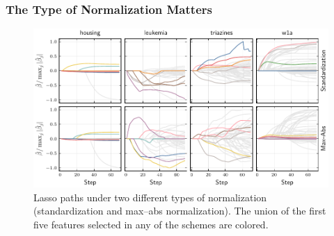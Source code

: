 \documentclass[10pt]{beamer}
\begin{document}
\begin{frame}[c]
  \frametitle{The Type of Normalization Matters}

  \begin{figure}[htpb]
    \centering
    \includegraphics[width=\textwidth]{figures/paper6-realdata_paths.pdf}
    \caption{%
      Lasso paths under two different types of normalization (standardization and max--abs normalization). The union of the first five features selected in any of the schemes are colored.
    }
  \end{figure}

\end{frame}
\end{document}
